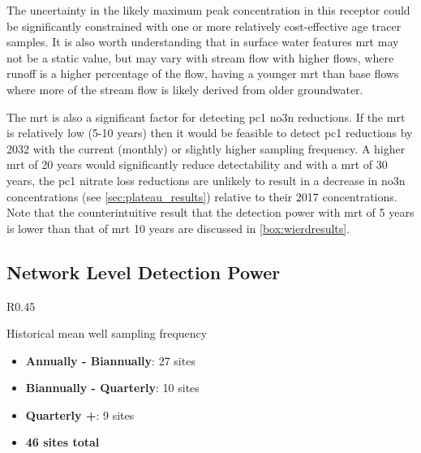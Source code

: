 The uncertainty in the likely maximum peak concentration in this receptor could be significantly constrained with one or more relatively cost-effective age tracer samples.
It is also worth understanding that in surface water features \gls{mrt} may not be a static value, but may vary with stream flow with higher flows, where runoff is a higher percentage of the flow, having a younger \gls{mrt} than base flows where more of the stream flow is likely derived from older groundwater.


The \gls{mrt} is also a significant factor for detecting \gls{pc1} \gls{no3n} reductions.
If the \gls{mrt} is relatively low (5-10 years) then it would be feasible to detect \gls{pc1} reductions by 2032 with the current (monthly) or slightly higher sampling frequency.
A higher \gls{mrt} of 20 years would significantly reduce detectability and with a \gls{mrt} of 30 years, the \gls{pc1} nitrate loss reductions are unlikely to result in a decrease in \gls{no3n} concentrations (see \autoref{sec:plateau_results}) relative to their 2017 concentrations.
Note that the counterintuitive result that the detection power with \gls{mrt} of 5 years is lower than that of \gls{mrt} 10 years are discussed in \autoref{box:wierdresults}.


\pagebreak
\subsection[Network Detection Power]{Network Level Detection Power} \label{sec:network_results}


\begin{wrapfigure}{R}{0.45\textwidth}
    \begin{breakawaybox}[label={box:sfreq}]{Historical mean well sampling frequency}
        \begin{itemize}
        \item \textbf{Annually - Biannually}: 27 sites
        \item \textbf{Biannually - Quarterly}: 10 sites
        \item \textbf{Quarterly +}: 9 sites
        \item \textbf{46 sites total}
        \end{itemize}
    \end{breakawaybox}
\end{wrapfigure}

